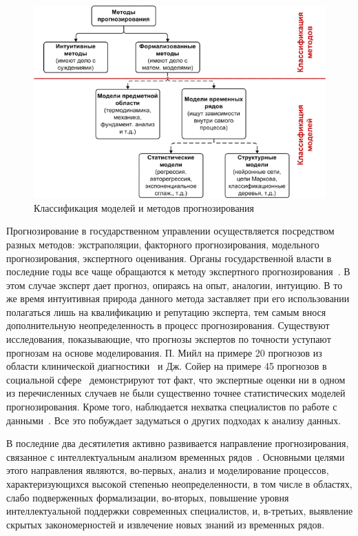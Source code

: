 \begin{figure}[bhtp]
    \includegraphics{images/mod_classifier.png}
    \caption{Классификация моделей и методов прогнозирования~\cite{Chuchueva13habr}}
    \label{figure:mod_classifier}
\end{figure}
Прогнозирование в государственном управлении осуществляется посредством разных методов: экстраполяции, факторного прогнозирования, 
модельного прогнозирования, экспертного оценивания. 
Органы государственной власти в последние годы все чаще обращаются к методу экспертного прогнозирования~\cite{Gegedush2008}. 
В этом случае эксперт дает прогноз, опираясь на опыт, аналогии, интуицию. 
В то же время интуитивная природа данного метода заставляет при его использовании полагаться лишь на квалификацию и репутацию эксперта, 
тем самым внося дополнительную неопределенность в процесс прогнозирования. 
Существуют исследования, показывающие, что прогнозы экспертов по точности уступают прогнозам на основе моделирования. 
П. Мийл на примере 20 прогнозов из области клинической диагностики~\cite{MeehlClinStat} 
и Дж. Сойер на примере 45 прогнозов в социальной сфере~\cite{Sawyer1966} демонстрируют тот факт, 
что экспертные оценки ни в одном из перечисленных случаев не были существенно точнее статистических моделей прогнозирования. 
Кроме того, наблюдается нехватка специалистов по работе с данными~\cite{Davenport2012}. 
Все это побуждает задуматься о других подходах к анализу данных. 

В последние два десятилетия активно развивается направление прогнозирования, связанное с интеллектуальным анализом временных рядов~\cite{Yarushkina2010}. 
Основными целями этого направления являются, во-первых, анализ и моделирование процессов, характеризующихся высокой степенью неопределенности, 
в том числе в областях, слабо подверженных формализации, 
во-вторых, повышение уровня интеллектуальной поддержки современных специалистов, 
и, в-третьих, выявление скрытых закономерностей и извлечение новых знаний из временных рядов. 

